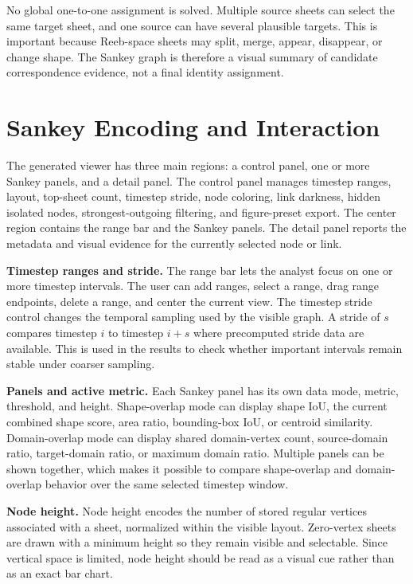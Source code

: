 \documentclass{vgtc}
\newcommand{\myparagraph}[1]{\vspace{1mm} \noindent \textbf{#1}}
\begin{document}
No global one-to-one assignment is solved. Multiple source sheets can select the same target sheet, and one source can have several plausible targets. This is important because Reeb-space sheets may split, merge, appear, disappear, or change shape. The Sankey graph is therefore a visual summary of candidate correspondence evidence, not a final identity assignment.

\section{Sankey Encoding and Interaction}

The generated viewer has three main regions: a control panel, one or more Sankey panels, and a detail panel. The control panel manages timestep ranges, layout, top-sheet count, timestep stride, node coloring, link darkness, hidden isolated nodes, strongest-outgoing filtering, and figure-preset export. The center region contains the range bar and the Sankey panels. The detail panel reports the metadata and visual evidence for the currently selected node or link.

\myparagraph{Timestep ranges and stride.}
The range bar lets the analyst focus on one or more timestep intervals. The user can add ranges, select a range, drag range endpoints, delete a range, and center the current view. The timestep stride control changes the temporal sampling used by the visible graph. A stride of $s$ compares timestep $i$ to timestep $i+s$ where precomputed stride data are available. This is used in the results to check whether important intervals remain stable under coarser sampling.

\myparagraph{Panels and active metric.}
Each Sankey panel has its own data mode, metric, threshold, and height. Shape-overlap mode can display shape IoU, the current combined shape score, area ratio, bounding-box IoU, or centroid similarity. Domain-overlap mode can display shared domain-vertex count, source-domain ratio, target-domain ratio, or maximum domain ratio. Multiple panels can be shown together, which makes it possible to compare shape-overlap and domain-overlap behavior over the same selected timestep window.

\myparagraph{Node height.}
Node height encodes the number of stored regular vertices associated with a sheet, normalized within the visible layout. Zero-vertex sheets are drawn with a minimum height so they remain visible and selectable. Since vertical space is limited, node height should be read as a visual cue rather than as an exact bar chart.
\end{document}
